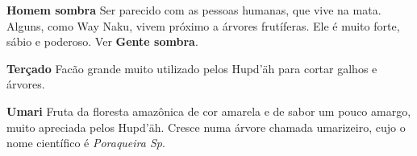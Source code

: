 \textbf{Homem sombra} Ser parecido com as pessoas
humanas, que vive na mata. Alguns, como Way Naku, vivem próximo a árvores frutíferas. Ele
é muito forte, sábio e poderoso. Ver \textbf{Gente­ sombra}.

\textbf{Terçado} Facão grande muito utilizado pelos Hupd’äh para cortar
galhos e árvores.

\textbf{Umari} Fruta da floresta amazônica de cor
amarela e de sabor um pouco amargo, muito apreciada pelos Hupd’äh.
Cresce numa árvore chamada umarizeiro, cujo o nome científico é \textit{Poraqueira Sp}.











